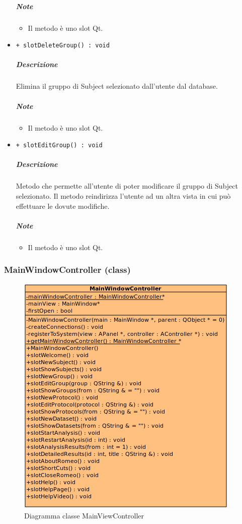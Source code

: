 \begin{itemize}
			\subparagraph{Note}
			\begin{itemize}
				\item Il metodo è uno slot\g{} Qt\g{}.
			\end{itemize}
			\item \color{blue} \verb!+ slotDeleteGroup() : void!
			\color{black}
			\subparagraph{Descrizione} Elimina il gruppo di Subject\g{} selezionato dall'utente dal database.
			\subparagraph{Note}
			\begin{itemize}
				\item Il metodo è uno slot\g{} Qt\g{}.
			\end{itemize}
			\item \color{blue} \verb!+ slotEditGroup() : void!
			\color{black}
			\subparagraph{Descrizione} Metodo che permette all'utente di poter modificare il gruppo di Subject\g{} selezionato. Il metodo reindirizza l'utente ad un altra vista in cui può effettuare le dovute modifiche.
			\subparagraph{Note}
			\begin{itemize}
				\item Il metodo è uno slot\g{} Qt\g{}.
			\end{itemize}
		\end{itemize}
		\pagebreak
	\subsubsection{MainWindowController (class)}
	\begin{figure}[!h]
		\centering
		\includegraphics[width=0.75\linewidth]{./Content/Immagini/controller/MainViewController.png}
		\caption{Diagramma classe MainViewController}
	\end{figure}
